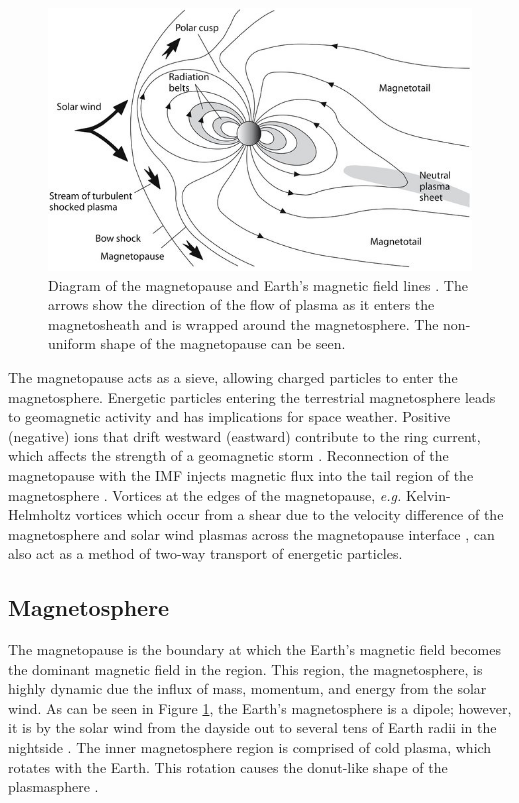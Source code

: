 \begin{figure}
    \centering
    \includegraphics[width=\linewidth]{Figures/The-magnetosphere-is-the-region-where-Earths-magnetic-field-predominates-The_W640.jpg}
    \caption[Diagram of the magnetopause and Earth's magnetic field lines.]{Diagram of the magnetopause and Earth's magnetic field lines \citep{Anderson:2018}. The arrows show the direction of the flow of plasma as it enters the magnetosheath and is wrapped around the magnetosphere. The non-uniform shape of the magnetopause can be seen.}
    \label{fig:magnetopause}
\end{figure}

The magnetopause acts as a sieve, allowing charged particles to enter the magnetosphere. Energetic particles entering the terrestrial magnetosphere leads to geomagnetic activity and has implications for space weather. Positive (negative) ions that drift westward (eastward) contribute to the ring current, which affects the strength of a geomagnetic storm \citep{Williams:1981}. Reconnection of the magnetopause with the IMF injects magnetic flux into the tail region of the magnetosphere \citep{Tsurutani:1990}. Vortices at the edges of the magnetopause, \textit{e.g.} Kelvin-Helmholtz vortices which occur from a shear due to the velocity difference of the magnetosphere and solar wind plasmas across the magnetopause interface \citep{Nykyri:2001}, can also act as a method of two-way transport of energetic particles.

\subsection{Magnetosphere}
The magnetopause is the boundary at which the Earth's magnetic field becomes the dominant magnetic field in the region. This region, the magnetosphere, is highly dynamic due the influx of mass, momentum, and energy from the solar wind. As can be seen in Figure \ref{fig:magnetopause}, the Earth's magnetosphere is a dipole; however, it is by the solar wind from the dayside out to several tens of Earth radii in the nightside \citep{Borovsky:2018}. The inner magnetosphere region is comprised of cold plasma, which rotates with the Earth. This rotation causes the donut-like shape of the plasmasphere \citep{Borovsky:2018}. 


